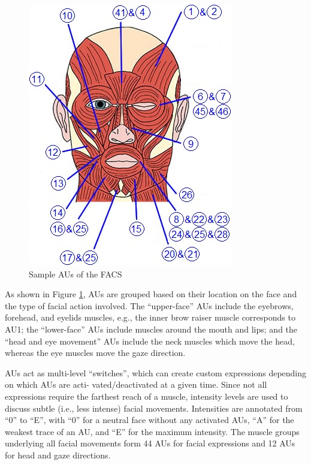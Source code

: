 \documentclass[12pt]{article}
\begin{document}
\begin{figure}
    \centering
    \vspace{-5mm}
    \includegraphics[width=\linewidth]{FaceMuscles-AUs.jpg}
    \caption{Sample AUs of the FACS}
    \label{fig:facs}
\end{figure}

As shown in Figure \ref{fig:facs}, AUs
are grouped based on their location on the face and the
type of facial action involved. The “upper-face” AUs include
the eyebrows, forehead, and eyelids muscles, e.g., the inner
brow raiser muscle corresponds to AU1; the “lower-face”
AUs include muscles around the mouth and lips; and the
“head and eye movement” AUs include the neck muscles
which move the head, whereas the eye muscles move the
gaze direction.

AUs act as multi-level “switches”, which can create
custom expressions depending on which AUs are acti-
vated/deactivated at a given time. Since not all expressions
require the farthest reach of a muscle, intensity levels are
used to discuss subtle (i.e., less intense) facial movements.
Intensities are annotated from “0” to “E”, with “0” for a
neutral face without any activated AUs, “A” for the weakest
trace of an AU, and “E” for the maximum intensity.
The muscle groups underlying all facial movements
form 44 AUs for facial expressions and 12 AUs for head
and gaze directions.  
\end{document}
